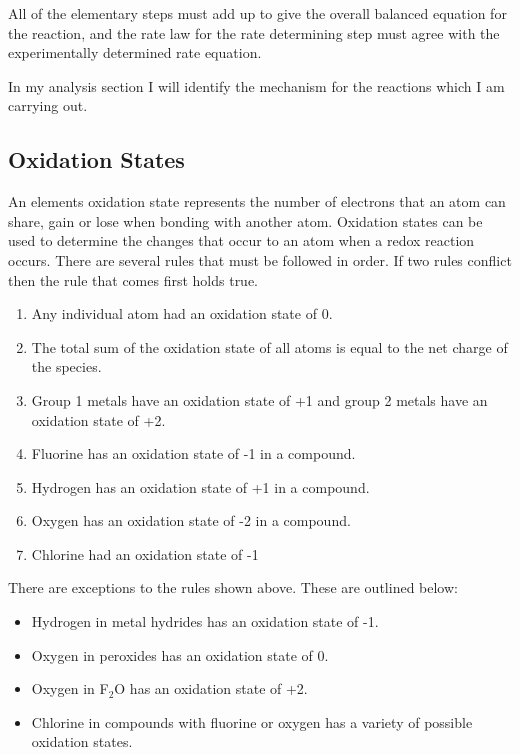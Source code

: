 All of the elementary steps must add up to give the overall balanced equation for the reaction, and the rate law for the rate determining step must agree with the experimentally determined rate equation.


In my analysis section I will identify the mechanism for the reactions which I am carrying out.

	\subsection{Oxidation States}

An elements oxidation state represents the number of electrons that an atom can share, gain or lose when bonding with another atom. Oxidation states can be used to determine the changes that occur to an atom when a redox reaction occurs. There are several rules that must be followed in order. If two rules conflict then the rule that comes first holds true.

\begin{enumerate}
\item Any individual atom had an oxidation state of 0.
\item The total sum of the oxidation state of all atoms is equal to the net charge of the species.
\item Group 1 metals have an oxidation state of +1 and group 2 metals have an oxidation state of +2.
\item Fluorine has an oxidation state of -1 in a compound.
\item Hydrogen has an oxidation state of +1 in a compound.
\item Oxygen has an oxidation state of -2 in a compound.
\item Chlorine had an oxidation state of -1
\end{enumerate}

There are exceptions to the rules shown above. These are outlined below:

\begin{itemize}
\item Hydrogen in metal hydrides has an oxidation state of -1.
\item Oxygen in peroxides has an oxidation state of 0.
\item Oxygen in F$_2$O has an oxidation state of +2.
\item Chlorine in compounds with fluorine or oxygen has a variety of possible oxidation states.
\end{itemize}





